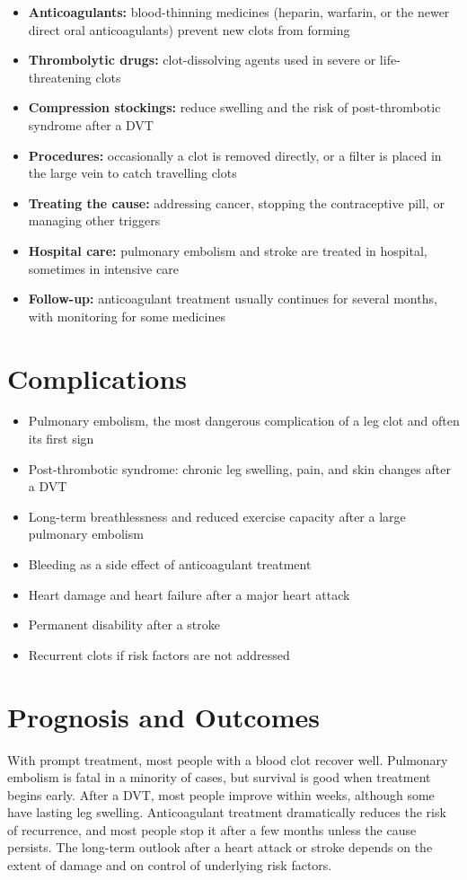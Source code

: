 \begin{itemize}
    \item \textbf{Anticoagulants:} blood-thinning medicines (heparin, warfarin, or the newer direct oral anticoagulants) prevent new clots from forming
    \item \textbf{Thrombolytic drugs:} clot-dissolving agents used in severe or life-threatening clots
    \item \textbf{Compression stockings:} reduce swelling and the risk of post-thrombotic syndrome after a DVT
    \item \textbf{Procedures:} occasionally a clot is removed directly, or a filter is placed in the large vein to catch travelling clots
    \item \textbf{Treating the cause:} addressing cancer, stopping the contraceptive pill, or managing other triggers
    \item \textbf{Hospital care:} pulmonary embolism and stroke are treated in hospital, sometimes in intensive care
    \item \textbf{Follow-up:} anticoagulant treatment usually continues for several months, with monitoring for some medicines
\end{itemize}

\section*{Complications}
\begin{itemize}
    \item Pulmonary embolism, the most dangerous complication of a leg clot and often its first sign
    \item Post-thrombotic syndrome: chronic leg swelling, pain, and skin changes after a DVT
    \item Long-term breathlessness and reduced exercise capacity after a large pulmonary embolism
    \item Bleeding as a side effect of anticoagulant treatment
    \item Heart damage and heart failure after a major heart attack
    \item Permanent disability after a stroke
    \item Recurrent clots if risk factors are not addressed
\end{itemize}

\section*{Prognosis and Outcomes}
With prompt treatment, most people with a blood clot recover well. Pulmonary embolism is fatal in a minority of cases, but survival is good when treatment begins early. After a DVT, most people improve within weeks, although some have lasting leg swelling. Anticoagulant treatment dramatically reduces the risk of recurrence, and most people stop it after a few months unless the cause persists. The long-term outlook after a heart attack or stroke depends on the extent of damage and on control of underlying risk factors.

